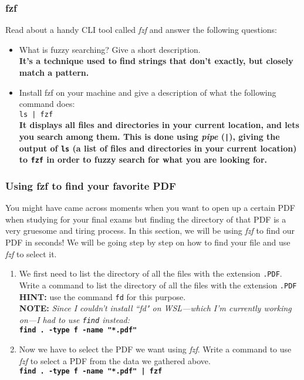 \documentclass[titlepage, 12pt]{article}
\newcommand{\code}{\texttt}
\begin{document}
	\subsubsection{fzf}
	Read about a handy CLI tool called \textit{fzf} and answer the following questions:
	\begin{itemize}
		\item What is fuzzy searching? Give a short description.
		\\
		\textbf{It's a technique used to find strings that don't exactly, but closely match a pattern.}
		\item Install fzf on your machine and give a description of what the following command does:
		\\
		\code{ls | fzf}
		\\
		\textbf{It displays all files and directories in your current location, and lets you search among them. This is done using \textit{pipe} (\code{|}), giving the output of \code{ls} (a list of files and directories in your current location) to \code{fzf} in order to fuzzy search for what you are looking for.}
	\end{itemize}
	
	\subsubsection{Using fzf to find your favorite PDF}
	You might have came across moments when you want to open up a certain PDF when studying for your final exams but finding the directory of that PDF is a very gruesome and tiring process. In this section, we will be using \textit{fzf} to find our PDF in seconds! We will be going step by step on how to find your file and use \textit{fzf} to select it.
	\begin{enumerate}
		\item We first need to list the directory of all the files with the extension \code{.PDF}. Write a
		command to list the directory of all the files with the extension \code{.PDF}
		\\
		\textbf{HINT:} use the command \code{fd} for this purpose.
		\\
		\textbf{NOTE: }\textit{Since I couldn't install ``fd" on WSL---which I'm currently working on---I had to use \code{find} instead:}
		\\
		\textbf{\code{find . -type f -name "*.pdf"}}
		\item Now we have to select the PDF we want using \textit{fzf}. Write a command to use \textit{fzf} to select a PDF from the data we gathered above.
		\\
		\textbf{\code{find . -type f -name "*.pdf" | fzf}}
	\end{enumerate}
	
\end{document}
